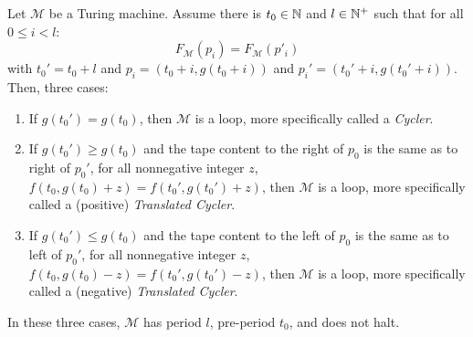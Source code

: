 \begin{theorem}[Loops]\label{th:loops:theory} Let $\mathcal{M}$ be a Turing machine.
    Assume there is $ t_0 \in \mathbb{N}$ and $l \in \mathbb{N}^+$ such that
    for all $0 \leq i < l$: $$F_\mathcal{M}(p_i)   = F_\mathcal{M}(p'_i)$$
    with $t_0' = t_0+l$ and $p_i = (t_0+i, g(t_0+i))$ and $p_i' = (t_0'+i, g(t_0'+i))$. Then, three cases:
    \begin{enumerate}
        \item If $g(t_0') = g(t_0)$, then $\mathcal{M}$ is a loop, more specifically called a \textit{Cycler}.\label{th:case1}
        \item If $g(t_0') \geq g(t_0)$ and the tape content to the right of $p_0$ is the same as to right of $p_0'$, \ie for all nonnegative integer $z$, $f(t_0,g(t_0)+z) = f(t_0',g(t_0')+z)$, then $\mathcal{M}$ is a loop, more specifically called a (positive) \textit{Translated Cycler}.\label{th:case2}
        \item If $g(t_0') \leq g(t_0)$ and the tape content to the left of $p_0$ is the same as to left of $p_0'$, \ie for all nonnegative integer $z$, $f(t_0,g(t_0)-z) = f(t_0',g(t_0')-z)$, then $\mathcal{M}$ is a loop, more specifically called a (negative) \textit{Translated Cycler}.\label{th:case3}
    \end{enumerate}
    In these three cases, $\mathcal{M}$ has period $l$, pre-period $t_0$, and does not halt.
\end{theorem}

